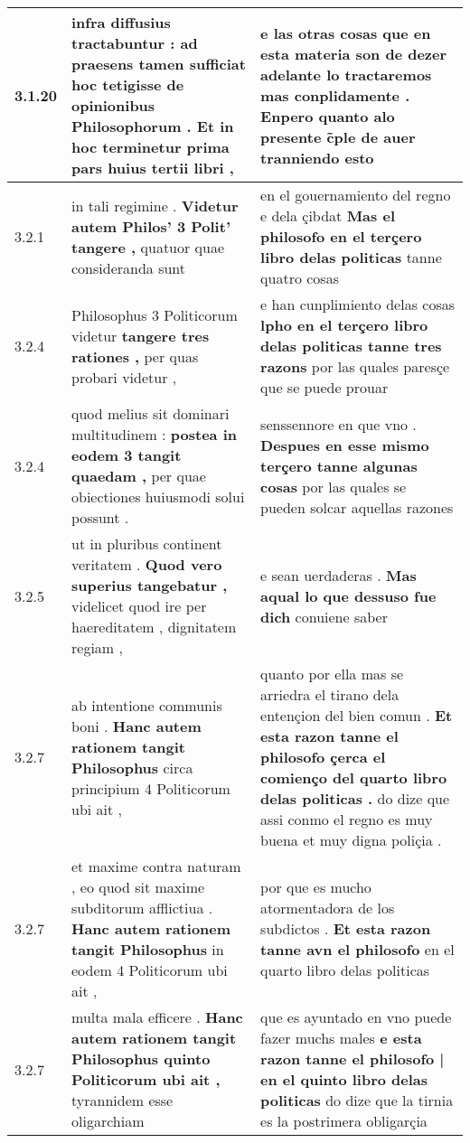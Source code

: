 \begin{tabular}{|p{1cm}|p{6.5cm}|p{6.5cm}|}
3.1.20 & infra diffusius tractabuntur : \textbf{ ad praesens tamen sufficiat hoc tetigisse de opinionibus Philosophorum . } Et in hoc terminetur prima pars huius tertii libri , & e las otras cosas \textbf{ que en esta materia son de dezer adelante lo tractaremos mas conplidamente . } Enpero quanto alo presente c̃ple de auer tranniendo esto \\\hline
3.2.1 & in tali regimine . \textbf{ Videtur autem Philos’ 3 Polit’ tangere , } quatuor quae consideranda sunt & en el gouernamiento del regno e dela çibdat \textbf{ Mas el philosofo en el terçero libro delas politicas } tanne quatro cosas \\\hline
3.2.4 & Philosophus 3 Politicorum videtur \textbf{ tangere tres rationes , } per quas probari videtur , & e han cunplimiento delas cosas \textbf{ lpho en el terçero libro delas politicas tanne tres razons } por las quales paresçe que se puede prouar \\\hline
3.2.4 & quod melius sit dominari multitudinem : \textbf{ postea in eodem 3 tangit quaedam , } per quae obiectiones huiusmodi solui possunt . & senssennore en que vno . \textbf{ Despues en esse mismo terçero tanne algunas cosas } por las quales se pueden solcar aquellas razones \\\hline
3.2.5 & ut in pluribus continent veritatem . \textbf{ Quod vero superius tangebatur , } videlicet quod ire per haereditatem , dignitatem regiam , & e sean uerdaderas . \textbf{ Mas aqual lo que dessuso fue dich } conuiene saber \\\hline
3.2.7 & ab intentione communis boni . \textbf{ Hanc autem rationem tangit Philosophus } circa principium 4 Politicorum ubi ait , & quanto por ella mas se arriedra el tirano dela entençion del bien comun . \textbf{ Et esta razon tanne el philosofo çerca el comienço del quarto libro delas politicas . } do dize que assi conmo el regno es muy buena et muy digna poliçia . \\\hline
3.2.7 & et maxime contra naturam , eo quod sit maxime subditorum afflictiua . \textbf{ Hanc autem rationem tangit Philosophus } in eodem 4 Politicorum ubi ait , & por que es mucho atormentadora de los subdictos . \textbf{ Et esta razon tanne avn el philosofo } en el quarto libro delas politicas \\\hline
3.2.7 & multa mala efficere . \textbf{ Hanc autem rationem tangit Philosophus quinto Politicorum ubi ait , } tyrannidem esse oligarchiam & que es ayuntado en vno puede fazer muchs males \textbf{ e esta razon tanne el philosofo | en el quinto libro delas politicas } do dize que la tirnia es la postrimera obligarçia \\\hline

\end{tabular}

